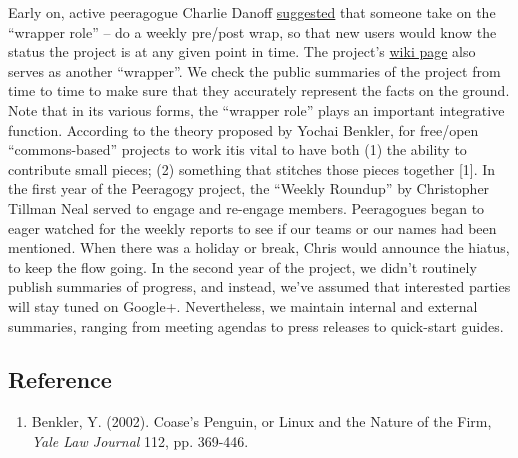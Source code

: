 Early on, active peeragogue Charlie Danoff
\href{http://socialmediaclassroom.com/host/peeragogy/wiki/rolesdivision-labor}{suggested}
that someone take on the ``wrapper role'' -- do a weekly pre/post wrap,
so that new users would know the status the project is at any given
point in time. The project's
\href{http://socialmediaclassroom.com/host/peeragogy/}{wiki page} also
serves as another ``wrapper''. We check the public summaries of the
project from time to time to make sure that they accurately represent
the facts on the ground. Note that in its various forms, the ``wrapper
role'' plays an important integrative function. According to the theory
proposed by Yochai Benkler, for free/open ``commons-based'' projects to
work itis vital to have both (1) the ability to contribute small pieces;
(2) something that stitches those pieces together {[}1{]}. In the first
year of the Peeragogy project, the ``Weekly Roundup'' by Christopher
Tillman Neal served to engage and re-engage members. Peeragogues began
to eager watched for the weekly reports to see if our teams or our names
had been mentioned. When there was a holiday or break, Chris would
announce the hiatus, to keep the flow going. In the second year of the
project, we didn't routinely publish summaries of progress, and instead,
we've assumed that interested parties will stay tuned on Google+.
Nevertheless, we maintain internal and external summaries, ranging from
meeting agendas to press releases to quick-start guides.

\subsection{Reference}

\begin{enumerate}
\item
  Benkler, Y. (2002). Coase's Penguin, or Linux and the Nature of the
  Firm, \emph{Yale Law Journal} 112, pp. 369-446.
\end{enumerate}
